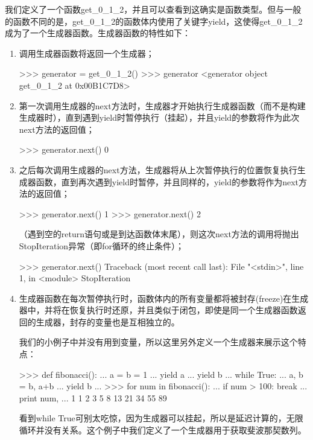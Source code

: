 \documentclass[12pt,a4paper]{report}
\begin{document}
我们定义了一个函数get\_0\_1\_2，并且可以查看到这确实是函数类型。但与一般的函数不同的是，get\_0\_1\_2的函数体内使用了关键字yield，这使得get\_0\_1\_2成为了一个生成器函数。生成器函数的特性如下： 
\begin{enumerate}
    \item 调用生成器函数将返回一个生成器；
        \begin{python}[moreemph={[4]42},caption={},label=ex1]
>>> generator = get_0_1_2()
>>> generator
<generator object get_0_1_2 at 0x00B1C7D8>
        \end{python}

    \item 第一次调用生成器的next方法时，生成器才开始执行生成器函数（而不是构建生成器时），直到遇到yield时暂停执行（挂起），并且yield的参数将作为此次next方法的返回值；
        \begin{python}[moreemph={[4]42},caption={},label=ex1]
>>> generator.next()
0
        \end{python}

    \item 之后每次调用生成器的next方法，生成器将从上次暂停执行的位置恢复执行生成器函数，直到再次遇到yield时暂停，并且同样的，yield的参数将作为next方法的返回值；
        \begin{python}[moreemph={[4]42},caption={},label=ex1]
>>> generator.next()
1
>>> generator.next()
2
        \end{python}

    （遇到空的return语句或是到达函数体末尾），则这次next方法的调用将抛出StopIteration异常（即for循环的终止条件）；
        \begin{python}[moreemph={[4]42},caption={},label=ex1]
>>> generator.next()
Traceback (most recent call last):
  File "<stdin>", line 1, in <module>
StopIteration
        \end{python}

    \item 生成器函数在每次暂停执行时，函数体内的所有变量都将被封存(freeze)在生成器中，并将在恢复执行时还原，并且类似于闭包，即使是同一个生成器函数返回的生成器，封存的变量也是互相独立的。

我们的小例子中并没有用到变量，所以这里另外定义一个生成器来展示这个特点：
        \begin{python}[moreemph={[4]42},caption={},label=ex1]
>>> def fibonacci():
...   a = b = 1
...   yield a
...   yield b
...   while True:
...     a, b = b, a+b
...     yield b
...
>>> for num in fibonacci():
...   if num > 100: break
...   print num,
...
1 1 2 3 5 8 13 21 34 55 89
        \end{python}

看到while True可别太吃惊，因为生成器可以挂起，所以是延迟计算的，无限循环并没有关系。这个例子中我们定义了一个生成器用于获取斐波那契数列。
\end{enumerate}
\end{document}
